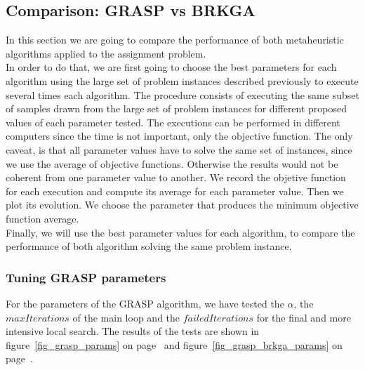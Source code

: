 \subsection{Comparison: GRASP vs BRKGA}

In this section we are going to compare the performance of both metaheuristic algorithms applied to the assignment problem.\\
In order to do that, we are first going to choose the best parameters for each algorithm using the large set of problem instances described previously to execute several times each algorithm. The procedure consists of executing the same subset of samples drawn from the large set of problem instances for different proposed values of each parameter tested. The executions can be performed in different computers since the time is not important, only the objective function. The only caveat, is that all parameter values have to solve the same set of instances, since we use the average of objective functions. Otherwise the results would not be coherent from one parameter value to another. We record the objetive function for each execution and compute its average for each parameter value. Then we plot its evolution. We choose the parameter that produces the minimum objective function average.\\
Finally, we will use the best parameter values for each algorithm, to  compare the performance of both algorithm solving the same problem instance.


\subsubsection{Tuning GRASP parameters}

For the parameters of the GRASP algorithm, we have tested the $\alpha$, the $maxIterations$ of the main loop and the $failedIterations$ for the final and more intensive local search. The results of the tests are shown in figure~\ref{fig_grasp_params} on page~\pageref{fig_grasp_params} and figure~\ref{fig_grasp_brkga_params} on page~\pageref{fig_grasp_brkga_params}.

